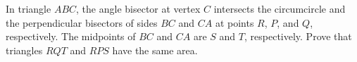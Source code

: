 In triangle $ABC$, the angle bisector at vertex $C$ intersects the circumcircle and the perpendicular bisectors of sides $BC$ and $CA$ at points $R$, $P$, and $Q$, respectively. The midpoints of $BC$ and $CA$ are $S$ and $T$, respectively. Prove that triangles $RQT$ and $RPS$ have the same area.
